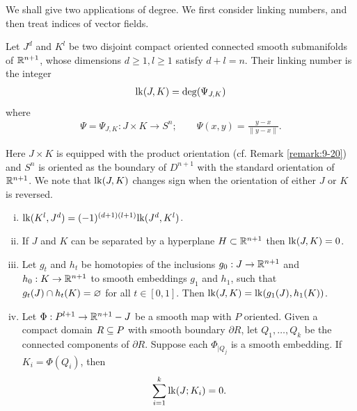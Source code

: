 We shall give two applications of degree. We first consider linking numbers, and
then treat indices of vector fields.

\begin{definition}\label{definition:11-12}
  Let $J^d$ and $K^l$ be two disjoint compact oriented connected smooth submanifolds of ${\mathbb{R}}^{n +1}$, 
  whose dimensions $d\ge 1, l\ge 1$ satisfy $d + l = n$. Their linking number is the integer
  \begin{align*}
    \mathrm{lk}(J, K) = \mathrm{deg}(\Psi_{J, K})
  \end{align*}
  where 
  \begin{align*}
    \Psi = \Psi_{J, K}:J\times K\to S^{n};\qquad \Psi(x, y) = \frac{y-x}{\|y-x\|}.
  \end{align*}
\end{definition}

Here $J\times K$ is equipped with the product orientation (cf. Remark \ref{remark:9-20}) and $S^n$ 
is oriented as the boundary of $D^{n+1}$ with the standard orientation of ${\mathbb{R}}^{n+1}$. We note
that $\mathrm{lk}(J, K)$ changes sign when the orientation of either $J$ or $K$ is reversed.

\begin{proposition}\label{prop:11-13} 
  \begin{enumerate}[(i)]
    \item $\mathrm{lk}(K^l, J^d) = (-1)^{(d+1)(l+1)}\mathrm{lk}(J^d, K^l)$.
    \item If $J$ and $K$ can be separated by a hyperplane $H\subset{\ensuremath{\mathbb{R}}}^{n+1}$ then $\mathrm{lk}(J, K) = 0$.
    \item Let $g_t$ and $h_t$ be homotopies of the inclusions $g_0:J\to{\ensuremath{\mathbb{R}}}^{n+1}$ and $h_0:K\to{\ensuremath{\mathbb{R}}}^{n+1}$
      to smooth embeddings $g_1$ and $h_1$, such that $g_t(J)\cap h_t(K) = \varnothing$ for all $t\in[0, 1]$. Then 
      $\mathrm{lk}(J, K) = \mathrm{lk}(g_1(J), h_1(K))$.
    \item Let $\Phi:P^{l+1}\to{\ensuremath{\mathbb{R}}}^{n+1}-J$ be a smooth map with $P$ oriented. Given a compact domain 
      $R\subseteq P$ with smooth boundary $\partial R$, let $Q_1, \ldots, Q_k$ be the connected components 
      of $\partial R$. Suppose each $\Phi_{|Q_j}$ is a smooth embedding. If $K_i = \Phi(Q_i)$, then 
      \begin{align*}
        \sum_{i=1 }^{k }{\mathrm{lk}(J; K_i)} = 0.
      \end{align*}
  \end{enumerate}
\end{proposition}

